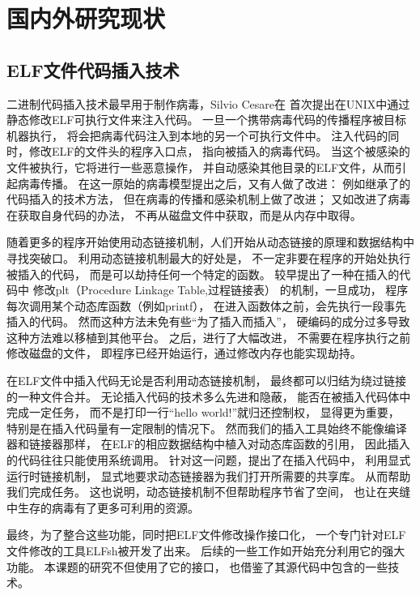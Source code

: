 \section{国内外研究现状}

\subsection{ELF文件代码插入技术}

二进制代码插入技术最早用于制作病毒，Silvio Cesare在\cite{silvio}
首次提出在UNIX中通过静态修改ELF可执行文件来注入代码。
一旦一个携带病毒代码的传播程序被目标机器执行，
将会把病毒代码注入到本地的另一个可执行文件中。
注入代码的同时，修改ELF的文件头的程序入口点，
指向被插入的病毒代码。
当这个被感染的文件被执行，它将进行一些恶意操作，
并自动感染其他目录的ELF文件，从而引起病毒传播。
在这一原始的病毒模型提出之后，又有人做了改进：
例如\cite{simple}继承了\cite{silvio}的代码插入的技术方法，
但在病毒的传播和感染机制上做了改进；
又如\cite{prototype}改进了病毒在获取自身代码的办法，
不再从磁盘文件中获取，而是从内存中取得。


随着更多的程序开始使用动态链接机制，人们开始从动态链接的原理和数据结构中
寻找突破口。
利用动态链接机制最大的好处是，
不一定非要在程序的开始处执行被插入的代码，
而是可以劫持任何一个特定的函数。
\cite{sharelib}较早提出了一种在插入的代码中
修改plt（Procedure Linkage Table,过程链接表）
的机制，一旦成功，
程序每次调用某个动态库函数（例如printf），
在进入函数体之前，会先执行一段事先插入的代码。
然而这种方法未免有些“为了插入而插入”，
硬编码的成分过多导致这种方法难以移植到其他平台。
之后，\cite{modern}进行了大幅改进，
不需要在程序执行之前修改磁盘的文件，
即程序已经开始运行，通过修改内存也能实现劫持。

在ELF文件中插入代码无论是否利用动态链接机制，
最终都可以归结为绕过链接的一种文件合并。
无论插入代码的技术多么先进和隐蔽，
能否在被插入代码体中完成一定任务，
而不是打印一行“hello world!”就归还控制权，
显得更为重要，
特别是在插入代码量有一定限制的情况下。
然而我们的插入工具始终不能像编译器和链接器那样，
在ELF的相应数据结构中植入对动态库函数的引用，
因此插入的代码往往只能使用系统调用。
针对这一问题，\cite{subversive}提出了在插入代码中，
利用显式运行时链接机制，
显式地要求动态链接器为我们打开所需要的共享库。
从而帮助我们完成任务。
这也说明，动态链接机制不但帮助程序节省了空间，
也让在夹缝中生存的病毒有了更多可利用的资源。


最终，为了整合这些功能，同时把ELF文件修改操作接口化，
一个专门针对ELF文件修改的工具ELFsh被开发了出来。
后续的一些工作如\cite{cerberus}开始充分利用它的强大功能。
本课题的研究不但使用了它的接口，
也借鉴了其源代码中包含的一些技术。


